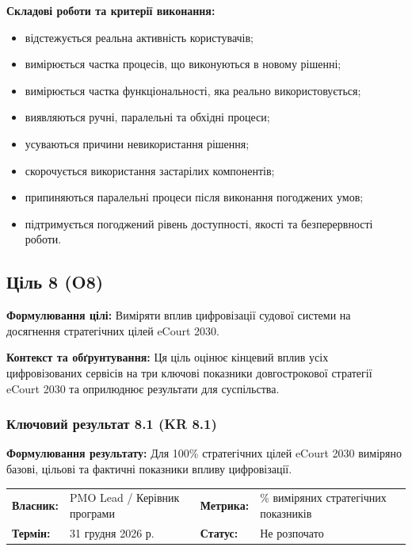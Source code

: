 \documentclass{article}
\begin{document}
\vspace{10pt}
\textbf{Складові роботи та критерії виконання:}
\begin{itemize}
    \item відстежується реальна активність користувачів;
    \item вимірюється частка процесів, що виконуються в новому рішенні;
    \item вимірюється частка функціональності, яка реально використовується;
    \item виявляються ручні, паралельні та обхідні процеси;
    \item усуваються причини невикористання рішення;
    \item скорочується використання застарілих компонентів;
    \item припиняються паралельні процеси після виконання погоджених умов;
    \item підтримується погоджений рівень доступності, якості та безперервності роботи.
\end{itemize}

\newpage

\subsection{Ціль 8 (O8)}

\textbf{Формулювання цілі:} Виміряти вплив цифровізації судової системи на досягнення стратегічних цілей eCourt 2030.

\textbf{Контекст та обґрунтування:}
Ця ціль оцінює кінцевий вплив усіх цифровізованих сервісів на три ключові показники довгострокової стратегії eCourt 2030 та оприлюднює результати для суспільства.

\subsubsection{Ключовий результат 8.1 (KR 8.1)}

\textbf{Формулювання результату:} Для 100\% стратегічних цілей eCourt 2030 виміряно базові, цільові та фактичні показники впливу цифровізації.

\noindent\begin{tabular}{@{}p{2.2cm}p{4.5cm}p{2.2cm}p{4.5cm}@{}}
\toprule
\textbf{Власник:} & PMO Lead / Керівник програми & \textbf{Метрика:} & \% виміряних стратегічних показників \\
\textbf{Термін:} & 31 грудня 2026 р. & \textbf{Статус:} & Не розпочато \\
\bottomrule
\end{tabular}
\end{document}
